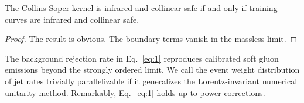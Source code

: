 \begin{theorem}\label{thm:3}
The Collins-Soper kernel is infrared and collinear safe if and only if
training curves are infrared and collinear safe.
\end{theorem}

\begin{proof}
The result is obvious. The boundary terms vanish in the massless limit.
\end{proof}

The background rejection rate in Eq.~\eqref{eq:1} reproduces calibrated
soft gluon emissions beyond the strongly ordered limit. We call the
event weight distribution of jet rates trivially parallelizable if it
generalizes the Lorentz-invariant numerical unitarity method.
Remarkably, Eq.~\eqref{eq:1} holds up to power corrections.


